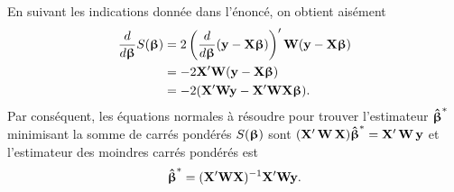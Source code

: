 \begin{solution}{3.14}
    En suivant les indications donnée dans l'énoncé, on obtient aisément
    \begin{align*}
      \frac{d}{d\boldsymbol{\upbeta}} S(\boldsymbol{\upbeta})
      &= 2 \left(\frac{d}{d\boldsymbol{\upbeta}}(\mathbf{y} - \mathbf{X}
        \boldsymbol{\upbeta})\right)^\prime \mathbf{W} (\mathbf{y} - \mathbf{X}
        \boldsymbol{\upbeta}) \\
      &= - 2 \mathbf{X}^\prime \mathbf{W} (\mathbf{y} - \mathbf{X}
        \boldsymbol{\upbeta}) \\
      &= -2 (\mathbf{X}^\prime \mathbf{W} \mathbf{y} - \mathbf{X}^\prime \mathbf{W}
      \mathbf{X} \boldsymbol{\upbeta}).
    \end{align*}
    Par conséquent, les équations normales à résoudre pour trouver
    l'estimateur $\boldsymbol{\hat{\upbeta}}^*$ minimisant la somme de carrés pondérés
    $S(\boldsymbol{\upbeta})$ sont $(\mathbf{X}^\prime\, \mathbf{W}\, \mathbf{X}) \boldsymbol{\hat{\upbeta}}^* =
    \mathbf{X}^\prime\, \mathbf{W}\, \mathbf{y}$ et l'estimateur des moindres
    carrés pondérés est
    \begin{displaymath}
      \boldsymbol{\hat{\upbeta}}^* = (\mathbf{X}^\prime \mathbf{W} \mathbf{X})^{-1} \mathbf{X}^\prime
      \mathbf{W} \mathbf{y}.
    \end{displaymath}
  
\end{solution}
